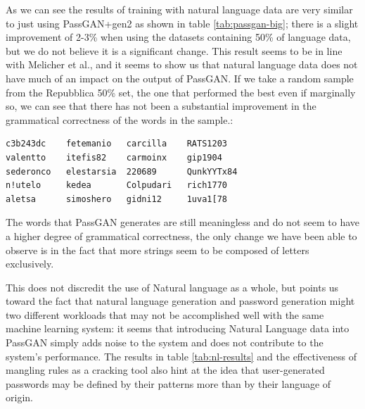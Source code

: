As we can see the results of training with natural language data are very similar to just using PassGAN+gen2 as shown in table \ref{tab:passgan-big}; there is a slight improvement of 2-3\% when using the datasets containing 50\% of language data, but we do not believe it is a significant change. This result seems to be in line with Melicher et al.\cite{Melicher2016}, and it seems to show us that natural language data does not have much of an impact on the output of PassGAN. 
If we take a random sample from the Repubblica 50\% set, the one that performed the best even if marginally so, we can see that there has not been a substantial improvement in the grammatical correctness of the words in the sample.:
\begin{verbatim}
c3b243dc    fetemanio   carcilla    RATS1203
valentto    itefis82    carmoinx    gip1904
sederonco   elestarsia  220689      QunkYYTx84
n!utelo     kedea       Colpudari   rich1770
aletsa      simoshero   gidni12     1uva1[78
\end{verbatim}    

The words that PassGAN generates are still meaningless and do not seem to have a higher degree of grammatical correctness, the only change we have been able to observe is in the fact that more strings seem to be composed of letters exclusively.

This does not discredit the use of Natural language as a whole, but points us toward the fact that natural language generation and password generation might two different workloads that may not be accomplished well with the same machine learning system: it seems that introducing Natural Language data into PassGAN simply adds noise to the system and does not contribute to the system's performance.
The results in table \ref{tab:nl-results} and the effectiveness of mangling rules as a cracking tool also hint at the idea that user-generated passwords may be defined by their patterns more than by their language of origin.
